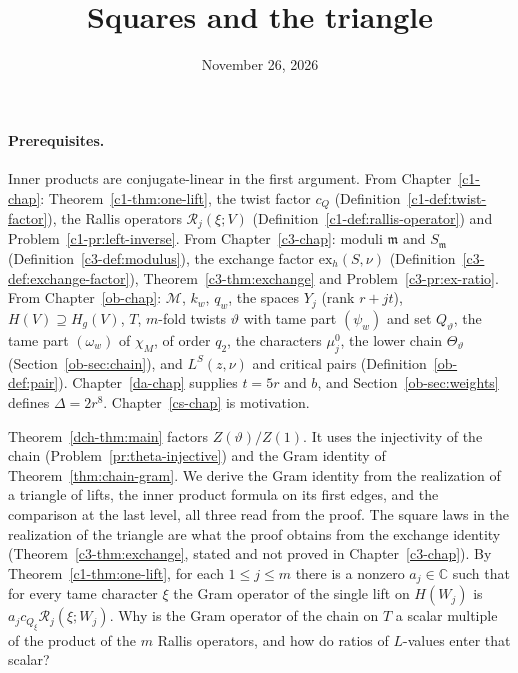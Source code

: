 \documentclass[reqno]{amsart}
\title{Squares and the triangle}
\author{}
\date{November 26, 2026}
\newcounter{chap}
\theoremstyle{definition}
\theoremstyle{plain}
\newcommand{\C}{\mathbb C}
\newcommand{\Rc}{\mathcal R}
\newcommand{\cM}{\mathcal M}
\newcommand{\ex}{\mathrm{ex}}
\begin{document}
\maketitle
{}\label{chap}

\paragraph{Prerequisites.}
Inner products are conjugate-linear in the first argument.  From Chapter~\ref{c1-chap}: Theorem~\ref{c1-thm:one-lift}, the twist factor \(c_Q\) (Definition~\ref{c1-def:twist-factor}), the Rallis operators \(\Rc_j(\xi; V)\) (Definition~\ref{c1-def:rallis-operator}) and Problem~\ref{c1-pr:left-inverse}.  From Chapter~\ref{c3-chap}: moduli \(\mathfrak m\) and \(S_{\mathfrak m}\) (Definition~\ref{c3-def:modulus}), the exchange factor \(\ex_h(S, \nu)\) (Definition~\ref{c3-def:exchange-factor}), Theorem~\ref{c3-thm:exchange} and Problem~\ref{c3-pr:ex-ratio}.  From Chapter~\ref{ob-chap}: \(\cM\), \(k_w\), \(q_w\), the spaces \(Y_j\) (rank \(r + jt\)), \(H(V) \supseteq H_g(V)\), \(T\), \(m\)-fold twists \(\vartheta\) with tame part \((\psi_w)\) and set \(Q_\vartheta\), the tame part \((\omega_w)\) of \(\chi_M\), of order \(q_2\), the characters \(\mu_j^0\), the lower chain \(\Theta_\vartheta\) (Section~\ref{ob-sec:chain}), and \(L^S(z, \nu)\) and critical pairs (Definition~\ref{ob-def:pair}).  Chapter~\ref{da-chap} supplies \(t = 5r\) and \(b\), and Section~\ref{ob-sec:weights} defines \(\Delta = 2r^8\).  Chapter~\ref{cs-chap} is motivation.

\medskip
Theorem~\ref{dch-thm:main} factors \(Z(\vartheta)/Z(1)\).  It uses the injectivity of the chain (Problem~\ref{pr:theta-injective}) and the Gram identity of Theorem~\ref{thm:chain-gram}.  We derive the Gram identity from the realization of a triangle of lifts, the inner product formula on its first edges, and the comparison at the last level, all three read from the proof.  The square laws in the realization of the triangle are what the proof obtains from the exchange identity (Theorem~\ref{c3-thm:exchange}, stated and not proved in Chapter~\ref{c3-chap}).  By Theorem~\ref{c1-thm:one-lift}, for each \(1 \le j \le m\) there is a nonzero \(a_j \in \C\) such that for every tame character \(\xi\) the Gram operator of the single lift on \(H(W_j)\) is \(a_j c_{Q_\xi}\Rc_j(\xi; W_j)\).  Why is the Gram operator of the chain on \(T\) a scalar multiple of the product of the \(m\) Rallis operators, and how do ratios of \(L\)-values enter that scalar?
\end{document}
